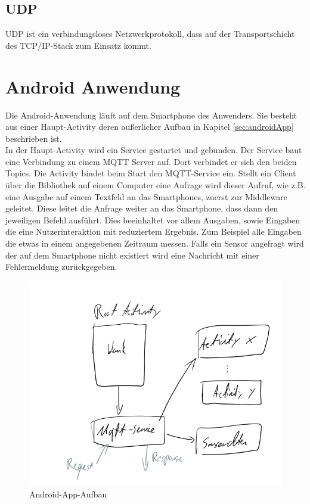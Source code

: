 \documentclass[11pt,a4paper]{report}
\begin{document}
\subsection{UDP}
UDP ist ein verbindungsloses Netzwerkprotokoll, dass auf der Transportschicht des TCP/IP-Stack zum Einsatz kommt.


\section{Android Anwendung}
Die Android-Anwendung läuft auf dem Smartphone des Anwenders.
Sie besteht aus einer Haupt-Activity deren außerlicher Aufbau in Kapitel \ref{sec:androidApp} beschrieben ist. 
\\
In der Haupt-Activity wird ein Service gestartet und gebunden.
Der Service baut eine Verbindung zu einem MQTT Server auf.
Dort verbindet er sich den beiden Topics. 
Die Activity bindet beim Start den MQTT-Service ein.
Stellt ein Client über die Bibliothek auf einem Computer eine Anfrage wird dieser Aufruf, wie z.B. eine Ausgabe auf einem Textfeld an das Smartphones,  zuerst zur Middleware geleitet.
Diese leitet die Anfrage weiter an das Smartphone, dass dann den jeweiligen Befehl ausführt.
Dies beeinhaltet vor allem Ausgaben, sowie Eingaben die eine Nutzerinteraktion mit reduziertem Ergebnis.
Zum Beispiel alle Eingaben die etwas in einem angegebenen Zeitraum messen.
Falls ein Sensor angefragt wird der auf dem Smartphone nicht existiert wird eine Nachricht mit einer Fehlermeldung zurückgegeben.
\begin{figure}[htbp]
  \centering
  \includegraphics[width=.9\textwidth]{images/android_app.png}
  \caption{Android-App-Aufbau}
  \label{fig:android_app}
\end{figure}
\end{document}
